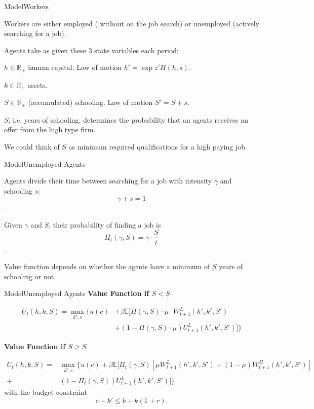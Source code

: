 \documentclass[notes, 10pt,t]{beamer}
\newenvironment{wideitemize}{\itemize\addtolength{\itemsep}{10pt}}{\enditemize}
\begin{document}
	\begin{frame}{Model}{Workers}
		\begin{wideitemize}
			\item Workers are either employed ( without on the job search) or unemployed (actively searching for a job).
			\item Agents take as given these $3$ state variables each period:
			\begin{wideitemize}
				\item $h \in \mathbb{R}_+$ human capital. Law of motion $ h' = \exp{z'} H(h,s) $.
				\item $k \in \mathbb{R}_+$ assets.
				\item $S \in \mathbb{R}_+$ (accumulated) schooling. Law of motion $ S' = S + s $.
			\end{wideitemize}
			\item $S$, i.e. years of schooling, determines the probability that an agents receives an offer from the high type firm. 
			\begin{wideitemize}
				\item We could think of $S$ as minimum required qualifications for a high paying job.
			\end{wideitemize}
		\end{wideitemize}
	\end{frame}

	\begin{frame}{Model}{Unemployed Agents}
		\begin{wideitemize}
			\item Agents divide their time between searching for a job with intensity $\gamma$ and schooling $s$: $$ \gamma + s = 1$$.
			\item Given $\gamma$ and $S$, their probability of finding a job is $$ \Pi_t(\gamma, S) = \gamma \cdot \frac{S}{t} $$.
			\item Value function depends on whether the agents have a minimum of $\underbar{S}$ years of schooling or not.
		\end{wideitemize}
	\end{frame}

	\begin{frame}{Model}{Unemployed Agents}
		\textbf{Value Function if $S < \underline{S}$}

		\begin{align*}
			U_t(h,k,S) =  \max_{k',s} \biggl\{ u(c) &+ \beta\mathbb{E}\biggl[\Pi(\gamma, S) \cdot \mu \cdot W^L_{t+1}(h',k',S')\\
			&+ (1 - \Pi(\gamma, S) \cdot \mu)U^L_{t+1}(h',k',S')  \biggr] \biggr\}
		\end{align*}


		\textbf{Value Function if $S \geq \underline{S}$}

		\begin{align*}
			U_t(h,k,S) = &  \max_{k',s} \biggl\{ u(c) + \beta\mathbb{E}\biggl[\Pi_t(\gamma, S) \left[\mu W^L_{t+1}(h',k',S') + (1 - \mu) W^H_{t+1}(h',k',S') \right]  \\
				+ & (1 - \Pi_t(\gamma, S)) U^L_{t+1}(h',k',S')  \biggr] \biggr\}
		\end{align*}
		with the budget constraint \[  c + k' \leq b + k(1+r). \]
	\end{frame}
\end{document}
